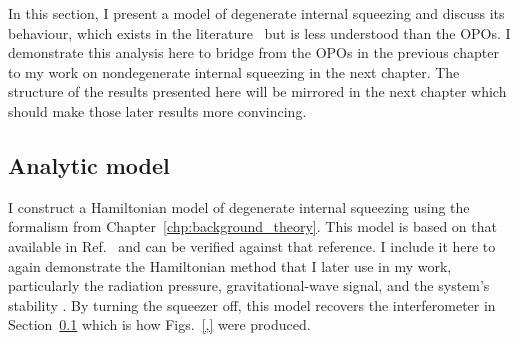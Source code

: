 In this section, I present a model of degenerate internal squeezing and discuss its behaviour, which exists in the literature~\cite{} but is less understood than the OPOs. I demonstrate this analysis here to bridge from the OPOs in the previous chapter to my work on nondegenerate internal squeezing in the next chapter. The structure of the results presented here will be mirrored in the next chapter which should make those later results more convincing.  %



\subsection{Analytic model}


I construct a Hamiltonian model of degenerate internal squeezing using the formalism from Chapter~\ref{chp:background_theory}. This model is based on that available in Ref.~\cite{Korobko2019} and can be verified against that reference. I include it here to again demonstrate the Hamiltonian method that I later use in my work, particularly the radiation pressure, gravitational-wave signal, and the system's stability . By turning the squeezer off, this model recovers the interferometer in Section~\ref{} which is how Figs.~\ref{,} were produced. 

